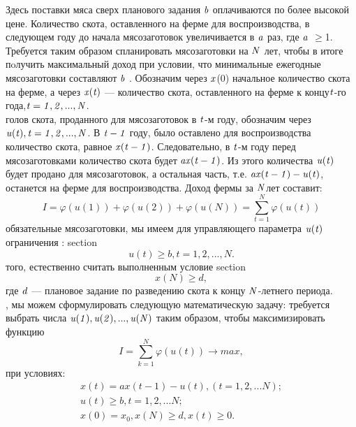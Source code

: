  Здесь поставки мяса сверх планового задания $\it b$ оплачиваются по  более высокой цене. Количество скота, оставленного на ферме для воспроизводства, в следующем году до начала мясозаготовок увеличивается в $\it a$ раз, где $\it a$ $\ge$1. Требуется таким образом спланировать мясозаготовки на $\it N$ лет, чтобы в итоге пoлучить максимальный доход при условии, что минимальные ежегодные мясозаготовки составляют $\it b$ .
\newpage
Обозначим через $\it x$(0) начальное количество скота на ферме, а через $\it x(t)$ — количество скота, оставленного на ферме к концу$\it t$-го года,$\it t=1,2,...,N$.\\
 голов скота, проданного для мясозаготовок в $\it t$-м году, обозначим через $\it u(t), t=1,2,...,N$. В $\it t-1$ году, было оставлено для воспроизводства количество скота, равное $\it x(t-1)$. Следовательно, в $\it t$-м году перед мясозаготовками количество скота будет $\it ax(t-1)$. Из этого количества $\it u(t)$ будет продано для мясозаготовок, а остальная часть, т.е. $\it ax(t-1)-u(t)$, останется на ферме для воспроизводства. Доход фермы за $\it N $лет составит:\begin{equation*}
I=\varphi(u(1)) + \varphi(u(2)) + \varphi(u(N))=\sum_{t=1}^N \varphi(u(t))\end{equation*}
 обязательные мясозаготовки, мы имеем для управляющего параметра $\it {u(t)}$ ограничения :
{section}\begin{equation*} {u(t) \ge b,   t=1,2,...,N.} \end{equation*}
 того, естественно считать выполненным условие 
 {section}\begin{equation*} x(N)\ge d , \end{equation*}
где $\it d$ — плановое задание по разведению скота к концу $\it N$-летнего периода.\\
, мы можем сформулировать следующую математическую задачу: требуется выбрать числа $\it u(1), u(2),..., u(N)$ таким образом, чтобы максимизировать функцию\begin{equation}\label{equation_7_1}
I = \sum_{k=1}^N \varphi(u(t)) \rightarrow max,
\end{equation}при условиях:
\begin{gather}
\label{equation_7_2}x(t) = ax(t-1)-u(t), (t = 1,2,...N); \\
\label{equation_7_3} u(t)\ge b, t = 1,2,...N; \\
\label{equation_7_4} x(0) = x_0, x(N) \ge d , x(t) \ge 0.
\end{gather}
